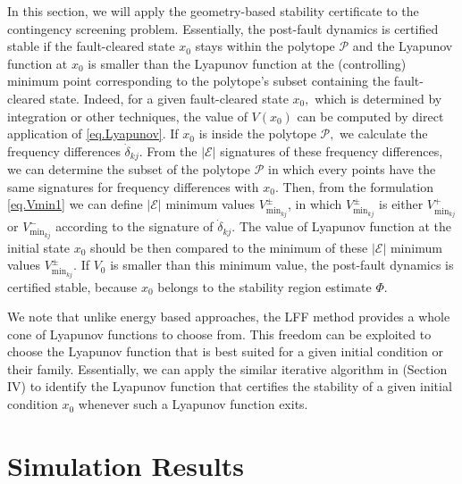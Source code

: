 \documentclass[final]{IEEEtran}
\begin{document}
\label{sec.screen} In this section, we will apply the geometry-based stability certificate to the contingency screening problem. Essentially, the post-fault dynamics is certified stable
if the fault-cleared state $x_0$ stays within the polytope $\mathcal{P}$ and the Lyapunov function at $x_0$ is smaller than the Lyapunov function at the (controlling) minimum point corresponding to the polytope's subset containing the fault-cleared state. Indeed, for a given fault-cleared state $x_0,$
which is determined by integration or other techniques, the value of $V(x_0)$ can be computed by direct application of
\eqref{eq.Lyapunov}. If $x_0$ is inside the polytope $\mathcal{P},$ we calculate the frequency differences $\dot{\delta}_{kj}.$ From the $|\mathcal{E}|$ signatures of these frequency differences,
we can determine the subset of the polytope $\mathcal{P}$ in which every points have the same signatures for frequency differences with $x_0.$ Then, from the formulation \eqref{eq.Vmin1} we can define $|\mathcal{E}|$
minimum values $V^{\pm}_{\min_{kj}}$, in which $V^{\pm}_{\min_{kj}}$ is either $V^{+}_{\min_{kj}}$ or $V^{-}_{\min_{kj}}$ according to the signature of $\dot{\delta}_{kj}.$ 
The value of Lyapunov function at the initial state $x_0$ should be then compared to the minimum
of these $|\mathcal{E}|$
minimum values $V^{\pm}_{\min_{kj}}$. If $V_0$ is smaller than this minimum value, the post-fault dynamics is certified stable, because $x_0$ belongs to the stability region estimate $\Phi$.

We note that unlike energy based approaches, the LFF method provides a whole
cone of Lyapunov functions to choose from. This freedom can be
exploited to choose the Lyapunov function that is best suited for
a given initial condition or their family. Essentially, we can apply the similar
 iterative algorithm in \cite{Vu:2014} (Section IV) to identify the Lyapunov
function that certifies the stability of a given initial condition
$x_0$ whenever such a Lyapunov function exits.

\section{Simulation Results}
\label{sec:simulation}
\end{document}
